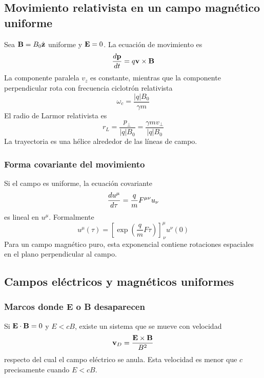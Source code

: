 \documentclass[]{article}
\numberwithin{equation}{section}
\begin{document}
\subsection{Movimiento relativista en un campo magnético uniforme}
Sea $\mathbf{B} = B_0\hat{\mathbf{z}}$ uniforme y $\mathbf{E} = 0$. La ecuación de movimiento es
\begin{equation*}
	\dfrac{d \mathbf{p}}{d t} = q\mathbf{v}\times\mathbf{B}
\end{equation*}
La componente paralela $v_z$ es constante, mientras que la componente perpendicular rota con frecuencia ciclotrón relativista
\begin{equation}
	\omega_c = \frac{|q|B_0}{\gamma m}
\end{equation}
El radio de Larmor relativista es
\begin{equation}
	r_L = \frac{p_\perp}{|q| B_0} = \frac{\gamma m v_\perp}{|q| B_0}
\end{equation}
La trayectoria es una hélice alrededor de las líneas de campo.

\subsubsection{Forma covariante del movimiento}
Si el campo es uniforme, la ecuación covariante
\begin{equation*}
	\dfrac{d u^\mu}{d \tau} = \frac{q}{m} F^{\mu\nu} u_\nu
\end{equation*}
es lineal en $u^\mu$. Formalmente
\begin{equation}
	u^\mu(\tau) = \left[\exp\left(\frac{q}{m} F \tau\right)\right]^\mu_{\, \nu} u^\nu (0)
\end{equation}
Para un campo magnético puro, esta exponencial contiene rotaciones espaciales en el plano perpendicular al campo.

\subsection{Campos eléctricos y magnéticos uniformes}
\subsubsection{Marcos donde E o B desaparecen}
Si $\mathbf{E} \cdot \mathbf{B} = 0$ y $E < cB$, existe un sistema que se mueve con velocidad
\begin{equation}
	\mathbf{v}_D = \frac{\mathbf{E}\times\mathbf{B}}{B^2} \label{v_drift}
\end{equation}
respecto del cual el campo eléctrico se anula. Esta velocidad es menor que $c$ precisamente cuando $E < cB$.
\end{document}
